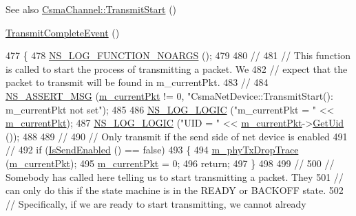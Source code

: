 \begin{DoxySeeAlso}{See also}
\hyperlink{classns3_1_1CsmaChannel_a413b29b1ffbcb8f2c4b3de3ed124dc95}{Csma\+Channel\+::\+Transmit\+Start} () 

\hyperlink{classns3_1_1CsmaNetDevice_a3f908850087739df8d27e1a7207261aa}{Transmit\+Complete\+Event} () 
\end{DoxySeeAlso}

\begin{DoxyCode}
477 \{
478   \hyperlink{log-macros-disabled_8h_a8f7e4afc291c9d29a65c18ac1f79197b}{NS\_LOG\_FUNCTION\_NOARGS} ();
479 
480   \textcolor{comment}{//}
481   \textcolor{comment}{// This function is called to start the process of transmitting a packet.  We }
482   \textcolor{comment}{// expect that the packet to transmit will be found in m\_currentPkt.}
483   \textcolor{comment}{//}
484   \hyperlink{assert_8h_aff5ece9066c74e681e74999856f08539}{NS\_ASSERT\_MSG} (\hyperlink{classns3_1_1CsmaNetDevice_a83f2aa389f676dec6bd1ff056bd61942}{m\_currentPkt} != 0, \textcolor{stringliteral}{"CsmaNetDevice::TransmitStart(): m\_currentPkt
       not set"});
485 
486   \hyperlink{group__logging_ga88acd260151caf2db9c0fc84997f45ce}{NS\_LOG\_LOGIC} (\textcolor{stringliteral}{"m\_currentPkt = "} << \hyperlink{classns3_1_1CsmaNetDevice_a83f2aa389f676dec6bd1ff056bd61942}{m\_currentPkt});
487   \hyperlink{group__logging_ga88acd260151caf2db9c0fc84997f45ce}{NS\_LOG\_LOGIC} (\textcolor{stringliteral}{"UID = "} << \hyperlink{classns3_1_1CsmaNetDevice_a83f2aa389f676dec6bd1ff056bd61942}{m\_currentPkt}->\hyperlink{classns3_1_1Packet_a1f212c825b50e54d94f5b9ae99592e6a}{GetUid} ());
488 
489   \textcolor{comment}{//}
490   \textcolor{comment}{// Only transmit if the send side of net device is enabled}
491   \textcolor{comment}{//}
492   \textcolor{keywordflow}{if} (\hyperlink{classns3_1_1CsmaNetDevice_a40e5946f8807cb9c65857789c3c2b269}{IsSendEnabled} () == \textcolor{keyword}{false})
493     \{
494       \hyperlink{classns3_1_1CsmaNetDevice_ad2a07cf80f83d9ce17d9280775e9a1f8}{m\_phyTxDropTrace} (\hyperlink{classns3_1_1CsmaNetDevice_a83f2aa389f676dec6bd1ff056bd61942}{m\_currentPkt});
495       \hyperlink{classns3_1_1CsmaNetDevice_a83f2aa389f676dec6bd1ff056bd61942}{m\_currentPkt} = 0;
496       \textcolor{keywordflow}{return};
497     \}
498 
499   \textcolor{comment}{//}
500   \textcolor{comment}{// Somebody has called here telling us to start transmitting a packet.  They }
501   \textcolor{comment}{// can only do this if the state machine is in the READY or BACKOFF state.}
502   \textcolor{comment}{// Specifically, if we are ready to start transmitting, we cannot already}

\end{DoxyCode}
